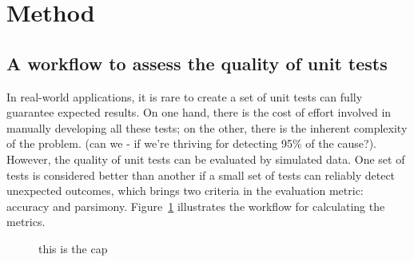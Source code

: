 \documentclass[
]{jds}
\begin{document}
\section{Method}\label{sec-method}

\subsection{A workflow to assess the quality of unit
tests}\label{a-workflow-to-assess-the-quality-of-unit-tests}

In real-world applications, it is rare to create a set of unit tests can
fully guarantee expected results. On one hand, there is the cost of
effort involved in manually developing all these tests; on the other,
there is the inherent complexity of the problem. (can we - if we're
thriving for detecting 95\% of the cause?). However, the quality of unit
tests can be evaluated by simulated data. One set of tests is considered
better than another if a small set of tests can reliably detect
unexpected outcomes, which brings two criteria in the evaluation metric:
accuracy and parsimony. Figure~\ref{fig-metric-calc} illustrates the
workflow for calculating the metrics.

\label{cell-fig-metric-calc}
\begin{figure}[H]


\caption{\label{fig-metric-calc}this is the cap}

\end{figure}%
\end{document}
